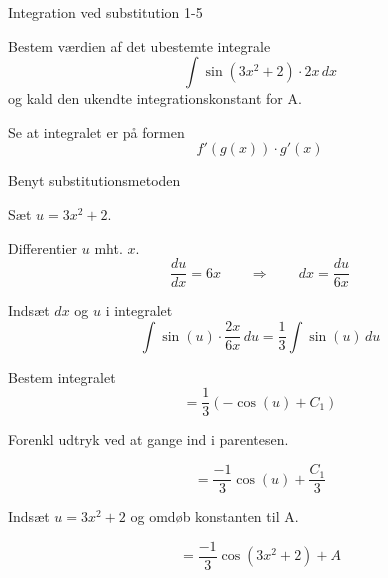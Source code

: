 \documentclass{article}
\begin{document}
\begin{exercise}{Integration ved substitution 1-5}


Bestem værdien af det ubestemte integrale
\[
\int \sin(3x^2 + 2) \cdot 2x \, dx
\]
og kald den ukendte integrationskonstant for A.




\hint

Se at integralet er på formen
\[
f'(g(x)) \cdot g'(x)
\]

\hint

Benyt substitutionsmetoden

\hint

Sæt $u=3x^2 + 2$.


\hint

Differentier $u$ mht. $x$.
\[
\frac{du}{dx} = 6x \qquad\Rightarrow \qquad dx = \frac{du}{6x}
\]

\hint

Indsæt $dx$ og $u$ i integralet
\[
\int \sin(u) \cdot \frac{2x}{6x} \, du = \frac{1}{3} \int \sin(u) \, du
\]

\hint

Bestem integralet
\[
= \frac{1}{3} \left(- \cos(u) + C_1 \right)
\]

\hint
Forenkl udtryk ved at gange ind i parentesen.

\hint

\[
= \frac{-1}{3} \cos(u) + \frac{C_1}{3}
\]

\hint

Indsæt $u = 3x^2 + 2$ og omdøb konstanten til A.

\hint

\[
= \frac{-1}{3} \cos(3x^2 + 2) + A
\]


\end{exercise}

\newpage
\end{document}
